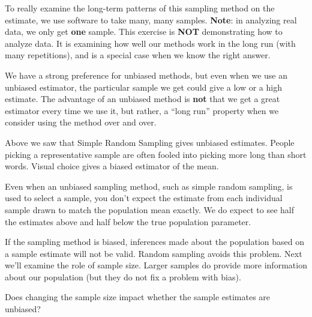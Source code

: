        To really examine the long-term patterns of this sampling
       method on the estimate, we use software to take many, many
       samples. {\bf Note}: in analyzing real data, we only get {\bf
         one} sample. This exercise is {\bf NOT} demonstrating how to
       analyze data. It is examining how well our methods work in the
       long run (with many repetitions), and is a special case when
       we know the right answer.

       We have a strong preference for unbiased methods, but even when
       we use an unbiased estimator, the particular sample we get
       could give a low or a high estimate.  The advantage of
       an unbiased method is {\bf not} that we get a great estimator
       every time we use it, but rather, a ``long run'' property when
       we consider using the method over and over.

       Above we saw that Simple Random Sampling gives
       unbiased estimates.  People picking a representative sample are
       often fooled into picking more long than short words.  Visual
       choice gives a biased estimator of the mean.

       Even when an unbiased sampling method, such as simple random
       sampling, is used to select a sample, you don't expect the
       estimate from each individual sample drawn to match the
       population mean exactly. We do expect to see half the estimates
       above and half below the true population parameter.

       If the sampling method is biased, inferences made about the
       population based on a sample estimate will not be valid. Random
       sampling avoids this problem.   Next we'll examine the role of
        sample size.  Larger samples do provide more
        information about our population (but they do not fix a problem
        with bias).

        \begin{center}
         {\large \sf Does changing the sample size impact whether the
           sample estimates are unbiased?} 
       \end{center}
     
